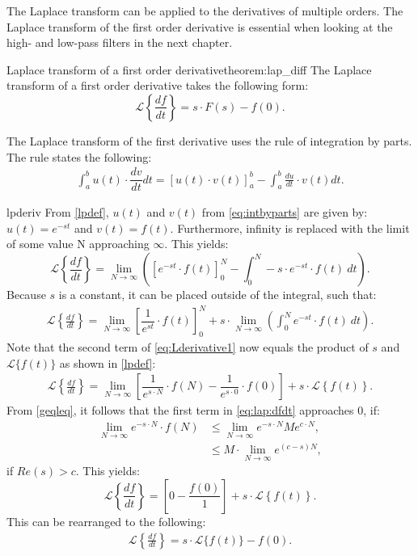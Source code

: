 \noindent The Laplace transform can be applied to the derivatives of multiple orders. The Laplace transform of the first order derivative is essential when looking at the high- and low-pass filters in the next chapter.
\\
\begin{theorem}{Laplace transform of a first order derivative}{theorem:lap_diff}
The Laplace transform of a first order derivative takes the following form: \cite[p.~332]{diffandcomplex}
$$\mathcal{L} \left\{\frac{df}{dt} \right\} = s \cdot F(s)-f(0).$$
\end{theorem}
\noindent The Laplace transform of the first derivative uses the rule of integration by parts. The rule states the following:
\begin{align}
\int_{a}^{b}{u(t) \cdot \dfrac{dv}{dt}dt}=\left[u(t) \cdot v(t) \right]_{a}^{b}-\int_{a}^{b} \frac{du}{dt}\cdot v(t) dt.
\label{eq:intbyparts}
\end{align}
\begin{prof}{}{lpderiv}
From \cref{lpdef}, $u(t)$ and $v(t)$ from \eqref{eq:intbyparts} are given by: $u(t) = e^{-st}$ and $v(t) = f(t)$. Furthermore, infinity is replaced with the limit of some value N approaching $\infty$. This yields:
$$\mathcal{L} \left\{\frac{df}{dt} \right\}=\lim_{N \to \infty} \left(\left[e^{-st}\cdot f(t)\right]_{0}^{N}-\int_{0}^{N} -s\cdot e^{-st}\cdot f(t)\ dt \right).$$
Because $s$ is a constant, it can be placed outside of the integral, such that:
\begin{align}
\mathcal{L} \left\{\frac{df}{dt} \right\}=\lim_{N \to \infty} \left[\dfrac{1}{e^{st}}\cdot f(t)\right]_{0}^{N}+ s \cdot \lim_{N \to \infty} \left( \int_{0}^{N}e^{-st}\cdot f(t)\ dt \right).\label{eq:Lderivative1}
\end{align}
Note that the second term of \eqref{eq:Lderivative1} now equals the product of $s$ and $\mathcal{L}\{f(t)\}$ as shown in \cref{lpdef}:
\begin{align}
\mathcal{L} \left\{\frac{df}{dt} \right\} = \lim_{N \to \infty}\left[\dfrac{1}{e^{s\cdot N}}\cdot f(N)-\dfrac{1}{e^{s\cdot 0}}\cdot f(0)\right]+s\cdot \mathcal{L} \left\{f(t) \right\}. \label{eq:lap:dfdt}
\end{align}
From \cref{geqleq}, it follows that the first term in \eqref{eq:lap:dfdt} approaches $0$, if:
\begin{align*}
\lim_{N \to \infty} e^{-s\cdot N}\cdot f(N) &\leq \lim_{N \to \infty} e^{-s\cdot N} Me^{c\cdot N},\\
&\leq M \cdot \lim_{N \to \infty} e^{(c-s)N},
\end{align*}
if $Re(s) > c$. This yields:
$$\mathcal{L} \left\{\frac{df}{dt} \right\} = \left[0-\dfrac{f(0)}{1}\right]+s\cdot \mathcal{L} \left\{f(t) \right\}.$$
This can be rearranged to the following:
\begin{align*}
\mathcal{L} \left\{\frac{df}{dt} \right\} = s\cdot \mathcal{L}\{f(t)\}-f(0).
\end{align*}

\end{prof}

